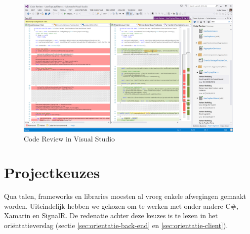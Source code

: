 \begin{figure}
  \begin{center}
    \includegraphics[width=\textwidth]{style/images/screenshots/CodeReview}
  \end{center}
  \caption{Code Review in Visual Studio}
  \label{fig:code-review}
\end{figure}

\section{Projectkeuzes}
Qua talen, frameworks en libraries moesten al vroeg enkele afwegingen gemaakt worden. Uiteindelijk hebben we gekozen om te werken met onder andere C\#, Xamarin en SignalR. De redenatie achter deze keuzes is te lezen in het oriëntatieverslag (sectie \ref{sec:orientatie-back-end}
en \ref{sec:orientatie-client}).

